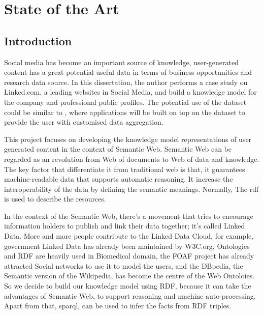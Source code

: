 \chapter{State of the Art}

\section{Introduction}

Social media has become an important source of knowledge, user-generated content has a great potential useful data in terms of business opportunities and research data source. In this dissertation, the author performs a case study on Linked.com, a leading websites in Social Media, and build a knowledge model for the company and professional public profiles. The potential use of the dataset could be similar to \cite{li2012}, where applications will be built on top on the dataset to provide the user with customised data aggregation.


This project focuses on developing the knowledge model representations of user generated content in the context of Semantic Web. Semantic Web can be regarded as an revolution from Web of documents to Web of data and knowledge.\cite{shadbolt2006} The key factor that differentiate it from traditional web is that, it guarantees machine-readable data that supports automatic reasoning. It increase the interoperability of the data by defining the semantic meanings. Normally, The \gls{rdf} is used to describe the resources.


In the context of the Semantic Web, there's a movement that tries to encourage information holders to publish and link their data together; it's called Linked Data. More and more people contribute to the Linked Data Cloud\cite{bizer2009}, for example, government Linked Data has already been maintained by W3C.org, Ontologies and RDF are heavily used in Biomedical domain, the FOAF project has already attracted Social networks to use it to model the users, and the DBpedia, the Semantic version of the Wikipedia, has become the centre of the Web Ontoloies\cite{auer2007}. So we decide to build our knowledge model using RDF, because it can take the advantages of Semantic Web, to support reasoning and machine auto-processing. Apart from that, \gls{sparql}, can be used to infer the facts from RDF triples.

